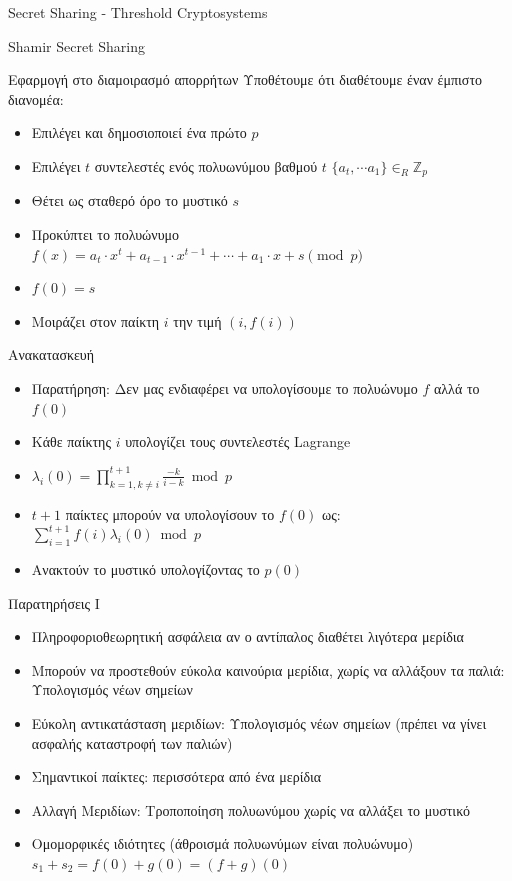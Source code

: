 \documentclass[handout]{beamer}
\begin{document}
\begin{section}{Secret Sharing - Threshold Cryptosystems}
\begin{frame}[allowframebreaks]{Shamir Secret Sharing}
\begin{block}{Εφαρμογή στο διαμοιρασμό απορρήτων}
Υποθέτουμε ότι διαθέτουμε έναν έμπιστο διανομέα:
\begin{itemize}
\item Επιλέγει και δημοσιοποιεί ένα πρώτο $p$
\item Επιλέγει $t$ συντελεστές ενός πολυωνύμου βαθμού $t$ $\{a_t, \cdots a_1 \} \in_R \mathbb{Z}_p$
\item Θέτει ως σταθερό όρο το μυστικό $s$
\item Προκύπτει το πολυώνυμο $f(x) = a_t \cdot x^t +  a_{t-1} \cdot x^{t-1} + \cdots + a_{1} \cdot x + s \pmod{p}$
\item $f(0)=s$
\item Μοιράζει στον παίκτη $i$ την τιμή $(i,f(i))$
\end{itemize}
\end{block}

\framebreak
\begin{block}{Ανακατασκευή}
\begin{itemize}
\item Παρατήρηση: Δεν μας ενδιαφέρει να υπολογίσουμε το πολυώνυμο $f$ αλλά το $f(0)$
\item Κάθε παίκτης $i$ υπολογίζει τους συντελεστές Lagrange
\item $\lambda_i(0) = \prod_{k=1, k \neq i}^{t+1} \frac{-k}{i-k} \bmod{p}$
\item $t+1$ παίκτες μπορούν να υπολογίσουν το $f(0)$ ως: $\sum_{i=1}^{t+1} f(i) \lambda_i(0) \bmod{p}$
\item Ανακτούν το μυστικό υπολογίζοντας το $p(0)$
\end{itemize}
\end{block}
\end{frame}

\begin{frame}{Παρατηρήσεις I}
\begin{itemize}
\item Πληροφοριοθεωρητική ασφάλεια αν ο αντίπαλος διαθέτει λιγότερα μερίδια
\pause
\item Μπορούν να προστεθούν εύκολα καινούρια μερίδια, χωρίς να αλλάξουν τα παλιά: Υπολογισμός νέων σημείων
\pause
\item Εύκολη αντικατάσταση μεριδίων: Υπολογισμός νέων σημείων (πρέπει να γίνει ασφαλής καταστροφή των παλιών)
\pause
\item Σημαντικοί παίκτες: περισσότερα από ένα μερίδια
\pause
\item Αλλαγή Μεριδίων: Τροποποίηση πολυωνύμου χωρίς να αλλάξει το μυστικό
\pause
\item Ομομορφικές ιδιότητες (άθροισμά πολυωνύμων είναι πολυώνυμο) \\
$s_1 + s_2 = f(0) + g(0) = (f+g)(0)$
\end{itemize}
\end{frame}


\end{section}
\end{document}

